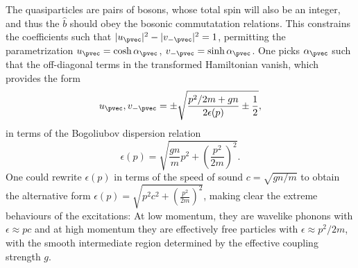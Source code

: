 	The quasiparticles are pairs of bosons, whose total spin will also be an integer, and thus the $\hat{b}$ should obey the bosonic commutatation relations. This constrains the coefficients such that $|u_\pvec|^2-|v_{-\pvec}|^2=1$, permitting the parametrization $u_\pvec = \cosh \alpha_\pvec$, $v_{-\pvec} = \sinh \alpha_\pvec$. One picks $\alpha_\pvec$ such that the off-diagonal terms in the transformed Hamiltonian vanish, which provides the form 
	\begin{equation}
		u_\pvec,v_{-\pvec} = \pm \sqrt{\frac{p^2/2m+gn}{2\epsilon(p)} \pm \frac{1}{2}},
	\end{equation}
	in terms of the Bogoliubov dispersion relation
	\begin{equation}
		\epsilon(p) = \sqrt{\frac{gn}{m}p^2+\left(\frac{p^2}{2m}\right)^2}.
	\end{equation}
	One could rewrite $\epsilon(p)$ in terms of the speed of sound $c=\sqrt{gn/m}$  to obtain the alternative form $\epsilon(p) = \sqrt{p^2c^2+\left(\frac{p^2}{2m}\right)^2}$, making clear the extreme behaviours of the excitations: At low momentum, they are wavelike phonons with $\epsilon\approx pc$ and at high momentum they are effectively free particles with $\epsilon\approx p^2/2m$, with the smooth intermediate region determined by the effective coupling strength $g$.

